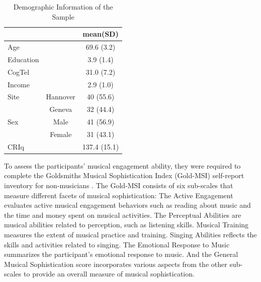 \begin{table}[h]
	\centering
	\caption{Demographic Information of the Sample}
	\label{tab:demographic}
		\renewcommand{\arraystretch}{1.2}
	\vspace{\medskipamount}
	\begin{tabular}{lcc}
		&     &  mean(SD)        \\
		\hline
		Age       &  & 69.6 (3.2) \\
		Education &  & 3.9 (1.4)  \\
		CogTel    &  & 31.0 (7.2) \\
		Income    &  & 2.9 (1.0)  \\
		Site      & Hannover         & 40 (55.6)  \\
		& Geneva         & 32 (44.4)  \\
		Sex      & Male         & 41 (56.9)  \\
		& Female         & 31 (43.1) \\
		CRIq & & 137.4 (15.1)\\
	\end{tabular}
\end{table}
To assess the participants' musical engagement ability, they were required to complete the Goldsmiths Musical Sophistication Index (Gold-MSI) self-report inventory for non-musicians \cite{Mullensiefen2014}. The Gold-MSI consists of six sub-scales that measure different facets of musical sophistication: The Active Engagement evaluates active musical engagement behaviors such as reading about music and the time and money spent on musical activities. The Perceptual Abilities are musical abilities related to perception, such as listening skills. Musical Training measures the extent of musical practice and training. Singing Abilities reflects the skills and activities related to singing. The Emotional Response to Music summarizes the participant's emotional response to music. And the General Musical Sophistication score incorporates various aspects from the other sub-scales to provide an overall measure of musical sophistication.

